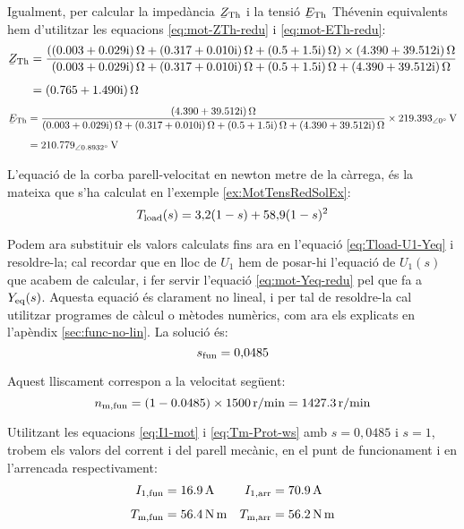 \begin{exemple}
	Igualment, per calcular  la impedància $\cmplx{Z}\ped{Th}$ i la tensió $\cmplx{E}\ped{Th}$ Thévenin equivalents hem d'utilitzar les equacions \eqref{eq:mot-ZTh-redu} i \eqref{eq:mot-ETh-redu}:
	\begin{align*}
		\cmplx{Z}\ped{Th} &= \frac{(\complexqty{0,003+j0,029}{\ohm} + \complexqty{0,317+j0,010}{\ohm} +  \complexqty{0,5+j1,5}{\ohm})\times\complexqty{4,390+j39,512}{\ohm}}
		{\complexqty{0,003+j0,029}{\ohm} + \complexqty{0,317+j0,010}{\ohm} + \complexqty{0,5+j1,5}{\ohm}+\complexqty{4,390+j39,512}{\ohm}}  \\[1ex]   
		&= \complexqty{0,765+j1,490}{\ohm}
	\end{align*}
	\vspace{-5mm}
	\begin{align*}		
		\cmplx{E}\ped{Th}  &= \frac{\complexqty{4,390+j39,512}{\ohm}}
		{\complexqty{0,003+j0,029}{\ohm} + \complexqty{0,317+j0,010}{\ohm} + \complexqty{0,5+j1,5}{\ohm}+\complexqty{4,390+j39,512}{\ohm}}\times\qtypd{219,393}{0}{V}  \\[1ex]   
		&=  \qtypd{210,779}{0,8932}{V}
	\end{align*}
	
	L'equació de la corba parell-velocitat en newton metre de la càrrega, és la mateixa que s'ha calculat en l'exemple  \ref{ex:MotTensRedSolEx}:
	\[
		T_\mathrm{load}(s) = 3{,}2 (1-s) + 58{,}9 (1-s)^2
	\]
	
	Podem ara substituir els  valors calculats fins ara en l'equació \eqref{eq:Tload-U1-Yeq} i resoldre-la; cal recordar que en lloc de $U_1$ hem de posar-hi l'equació de $U_1(s)$ que acabem de calcular, i fer servir l'equació \eqref{eq:mot-Yeq-redu} pel que fa a $Y_\mathrm{eq}(s)$. Aquesta equació és clarament no lineal, i per tal de resoldre-la cal utilitzar programes de càlcul o mètodes numèrics, com ara els explicats en l'apèndix \ref{sec:func-no-lin}. La solució és:
	\[
		s_\mathrm{fun} = 0{,}0485
	\]
	
	Aquest lliscament correspon a la velocitat següent:
	\[
		n_\mathrm{m,fun}= (1-\num{0,0485})\times \qty{1500}{r/min} = \qty{1427,3}{r/min}
	\]
	
	Utilitzant les equacions \eqref{eq:I1-mot} i \eqref{eq:Tm-Prot-ws} amb $s=0{,}0485$ i $s=1$, trobem els valors del corrent i del parell mecànic, en el punt de funcionament  i en l'arrencada respectivament:
	\begin{align*}
		I_\mathrm{1,fun} &= \qty{16,9}{A} &
		I_\mathrm{1,arr} &= \qty{70,9}{A} \\[1ex] 
		T_\mathrm{m,fun} &=  \qty{56,4}{N.m} & 
		T_\mathrm{m,arr} &=  \qty{56,2}{N.m}
	\end{align*}
	

\end{exemple}
